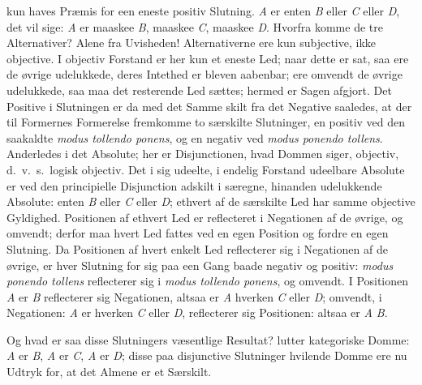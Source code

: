 \documentclass[12pt]{book}
\newcommand{\opage}[1]{\marginnote{\footnotesize\textit{[#1]}}}
\begin{document}
\opage{352}kun haves Præmis for een eneste positiv Slutning. \textit{A} er enten \textit{B} eller \textit{C} eller \textit{D}, det vil sige: \textit{A} er maaskee \textit{B}, maaskee \textit{C}, maaskee \textit{D}. Hvorfra komme de tre Alternativer? Alene fra Uvisheden! Alternativerne ere kun subjective, ikke objective. I objectiv Forstand er her kun et eneste Led; naar dette er sat, saa ere de øvrige udelukkede, deres Intethed er bleven aabenbar; ere omvendt de øvrige udelukkede, saa maa det resterende Led sættes; hermed er Sagen afgjort. Det Positive i Slutningen er da med det Samme skilt fra det Negative saaledes, at der til Formernes Formerelse fremkomme to særskilte Slutninger, en positiv ved den saakaldte \textit{modus tollendo ponens}, og en negativ ved \textit{modus ponendo tollens}. Anderledes i det Absolute; her er Disjunctionen, hvad Dommen siger, objectiv, d.\ v.\ s.\ logisk objectiv. Det i sig udeelte, i endelig Forstand udeelbare Absolute er ved den principielle Disjunction adskilt i særegne, hinanden udelukkende Absolute: enten \textit{B} eller \textit{C} eller \textit{D}; ethvert af de særskilte Led har samme objective Gyldighed. Positionen af ethvert Led er reflecteret i Negationen af de øvrige, og omvendt; derfor maa hvert Led fattes ved en egen Position og fordre en egen Slutning. Da Positionen af hvert enkelt Led reflecterer sig i Negationen af de øvrige, er hver Slutning for sig paa een Gang baade negativ og positiv: \textit{modus ponendo tollens} reflecterer sig i \textit{modus tollendo ponens}, og omvendt. I Positionen \textit{A} er \textit{B} reflecterer sig Negationen, altsaa er \textit{A} hverken \textit{C} eller \textit{D}; omvendt, i Negationen: \textit{A} er hverken \textit{C} eller \textit{D}, reflecterer sig Positionen: altsaa er \textit{A B}.

Og hvad er saa disse Slutningers væsentlige Resultat? lutter kategoriske Domme: \textit{A} er \textit{B}, \textit{A} er \textit{C}, \textit{A} er \textit{D}; disse paa disjunctive Slutninger hvilende Domme ere nu Udtryk for, at det Almene er et Særskilt.
\end{document}
